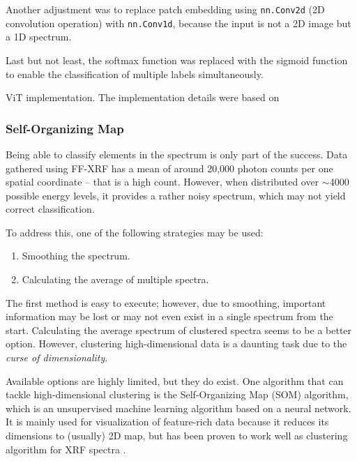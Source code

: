 Another adjustment was to replace patch embedding using \texttt{nn.Conv2d} (2D convolution operation) with \texttt{nn.Conv1d}, because the input is not a 2D image but a 1D spectrum. 

Last but not least, the softmax function was replaced with the sigmoid function to enable the classification of multiple labels simultaneously.

\newenvironment{longlistingC}{\captionsetup{type=listing, width=0.8\textwidth}}{}
\begin{longlistingC}
    \caption{ViT implementation. The implementation details were based on \cite{d2lViT}}
    \label{lst:vit}
\end{longlistingC}
\vspace{12pt}

\subsubsection{Self-Organizing Map}
Being able to classify elements in the spectrum is only part of the success. Data gathered using FF-XRF has a mean of around 20,000 photon counts per one spatial coordinate – that is a high count. However, when distributed over $\sim$4000 possible energy levels, it provides a rather noisy spectrum, which may not yield correct classification.

To address this, one of the following strategies may be used:
\begin{enumerate}
  \item Smoothing the spectrum.
  \item Calculating the average of multiple spectra.
\end{enumerate}

The first method is easy to execute; however, due to smoothing, important information may be lost or may not even exist in a single spectrum from the start. 
Calculating the average spectrum of clustered spectra seems to be a better option. 
However, clustering high-dimensional data is a daunting task due to the \emph{curse of dimensionality}.

Available options are highly limited, but they do exist. 
One algorithm that can tackle high-dimensional clustering is the Self-Organizing Map (SOM) algorithm, which is an unsupervised machine learning algorithm based on a neural network. 
It is mainly used for visualization of feature-rich data because it reduces its dimensions to (usually) 2D map, but has been proven to work well as clustering algorithm for XRF spectra \cite{Kogou2020}.

